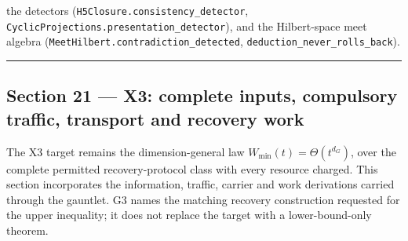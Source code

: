 \documentclass[
]{article}
\begin{document}
the detectors
(\texttt{H\allowbreak{}5\allowbreak{}C\allowbreak{}l\allowbreak{}o\allowbreak{}s\allowbreak{}u\allowbreak{}r\allowbreak{}e\allowbreak{}.\allowbreak{}c\allowbreak{}o\allowbreak{}n\allowbreak{}s\allowbreak{}i\allowbreak{}s\allowbreak{}t\allowbreak{}e\allowbreak{}n\allowbreak{}c\allowbreak{}y\allowbreak{}\_\allowbreak{}d\allowbreak{}e\allowbreak{}t\allowbreak{}e\allowbreak{}c\allowbreak{}t\allowbreak{}o\allowbreak{}r},
\texttt{C\allowbreak{}y\allowbreak{}c\allowbreak{}l\allowbreak{}i\allowbreak{}c\allowbreak{}P\allowbreak{}r\allowbreak{}o\allowbreak{}j\allowbreak{}e\allowbreak{}c\allowbreak{}t\allowbreak{}i\allowbreak{}o\allowbreak{}n\allowbreak{}s\allowbreak{}.\allowbreak{}p\allowbreak{}r\allowbreak{}e\allowbreak{}s\allowbreak{}e\allowbreak{}n\allowbreak{}t\allowbreak{}a\allowbreak{}t\allowbreak{}i\allowbreak{}o\allowbreak{}n\allowbreak{}\_\allowbreak{}d\allowbreak{}e\allowbreak{}t\allowbreak{}e\allowbreak{}c\allowbreak{}t\allowbreak{}o\allowbreak{}r}),
and the Hilbert-space meet algebra
(\texttt{M\allowbreak{}e\allowbreak{}e\allowbreak{}t\allowbreak{}H\allowbreak{}i\allowbreak{}l\allowbreak{}b\allowbreak{}e\allowbreak{}r\allowbreak{}t\allowbreak{}.\allowbreak{}c\allowbreak{}o\allowbreak{}n\allowbreak{}t\allowbreak{}r\allowbreak{}a\allowbreak{}d\allowbreak{}i\allowbreak{}c\allowbreak{}t\allowbreak{}i\allowbreak{}o\allowbreak{}n\allowbreak{}\_\allowbreak{}d\allowbreak{}e\allowbreak{}t\allowbreak{}e\allowbreak{}c\allowbreak{}t\allowbreak{}e\allowbreak{}d},
\texttt{d\allowbreak{}e\allowbreak{}d\allowbreak{}u\allowbreak{}c\allowbreak{}t\allowbreak{}i\allowbreak{}o\allowbreak{}n\allowbreak{}\_\allowbreak{}n\allowbreak{}e\allowbreak{}v\allowbreak{}e\allowbreak{}r\allowbreak{}\_\allowbreak{}r\allowbreak{}o\allowbreak{}l\allowbreak{}l\allowbreak{}s\allowbreak{}\_\allowbreak{}b\allowbreak{}a\allowbreak{}c\allowbreak{}k}).

\begin{center}\rule{0.5\linewidth}{0.5pt}\end{center}

\subsection{Section 21 --- X3: complete inputs, compulsory traffic,
transport and recovery
work}\label{section-21-x3-complete-inputs-compulsory-traffic-transport-and-recovery-work}

The X3 target remains the dimension-general law
\(W_{\min}(t)=\Theta(t^{d_G})\), over the complete permitted
recovery-protocol class with every resource charged. This section
incorporates the information, traffic, carrier and work derivations
carried through the gauntlet. G3 names the matching recovery
construction requested for the upper inequality; it does not replace the
target with a lower-bound-only theorem.
\end{document}
